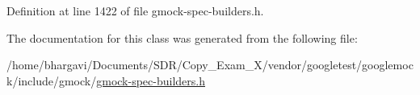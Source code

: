 Definition at line 1422 of file gmock-\/spec-\/builders.\+h.



The documentation for this class was generated from the following file\+:\begin{DoxyCompactItemize}
\item 
/home/bhargavi/\+Documents/\+S\+D\+R/\+Copy\+\_\+\+Exam\+\_\+X/vendor/googletest/googlemock/include/gmock/\hyperlink{gmock-spec-builders_8h}{gmock-\/spec-\/builders.\+h}\end{DoxyCompactItemize}
